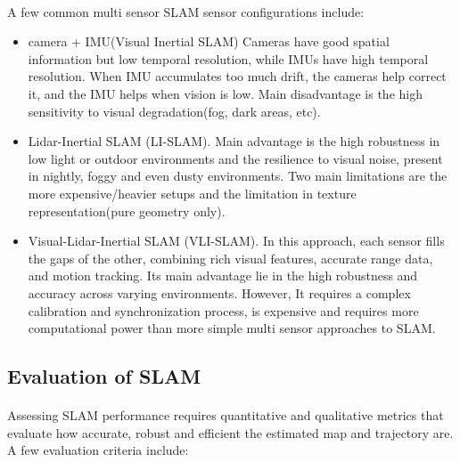 \paragraph{}A few common multi sensor \ac{SLAM} sensor configurations include:
\begin{itemize}
    \item camera + IMU(Visual Inertial \ac{SLAM})\cite{visual_inertial} Cameras have good spatial information but low temporal resolution, while IMUs have high temporal resolution. When IMU accumulates too much drift, the cameras help correct it, and the IMU helps when vision is low. Main disadvantage is the high sensitivity to visual degradation(fog, dark areas, etc).
    \item Lidar-Inertial SLAM (LI-SLAM)\cite{liu2024voxelslamcompleteaccurateversatile}. Main advantage is the high robustness in low light or outdoor environments and the resilience to visual noise, present in nightly, foggy and even dusty environments. Two main limitations are the more expensive/heavier setups and the limitation in texture representation(pure geometry only).
    \item Visual-Lidar-Inertial SLAM (VLI-SLAM)\cite{liu2023lidarinertialvisualslamloopdetection}. In this approach, each sensor fills the gaps of the other, combining rich visual features, accurate range data, and motion tracking. Its main advantage lie in the high robustness and accuracy across varying environments. However, It requires a complex calibration and synchronization process, is expensive and requires more computational power than more simple multi sensor approaches to \ac{SLAM}.
\end{itemize}

\subsection{Evaluation of SLAM}
\paragraph{}Assessing SLAM performance requires quantitative and qualitative metrics that evaluate how accurate, robust and efficient the estimated map and trajectory are. A few evaluation criteria include:

